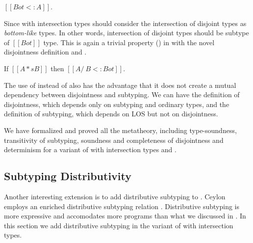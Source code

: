 \begin{lemma}
  $[[Bot <: A]]$.
\label{lemma:discussion:bls}
\end{lemma}

\noindent Since \cal with intersection types should consider the intersection of disjoint types 
as \emph{bottom-like} types. In other words, intersection of disjoint types
should be subtype of $[[Bot]]$ type.
This is again a trivial property () in \cal 
with the novel disjointness definition and .

\begin{lemma}
  If $[[A *s B]]$ then $[[A /\ B <: Bot]]$.
\label{lemma:discussion:disjoint-types}
\end{lemma}

\noindent The use of  instead of  also has the advantage that it does not
create a mutual dependency between disjointness and subtyping. We can have the definition
of disjointness, which depends only on subtyping and ordinary types, and the definition
of subtyping, which depends on LOS but not on disjointness.

We have formalized and proved all the metatheory, including type-soundness, transitivity of subtyping,
soundness and completeness of disjointness and determinism for a variant of \name with intersection types
and .

\subsection{Subtyping Distributivity}
\label{sec:inter:dist}

 

Another interesting extension is to add distributive subtyping to \cal.
Ceylon~\cite{muehlboeck2018empowering} employs an enriched 
distributive subtyping relation \cite{barendregt1983filter,barbanera1995intersection}.
Distributive subtyping is more expressive and accomodates more programs than what we discussed in
. In this section we add distributive subtyping in the variant of \cal with
intersection types. 

